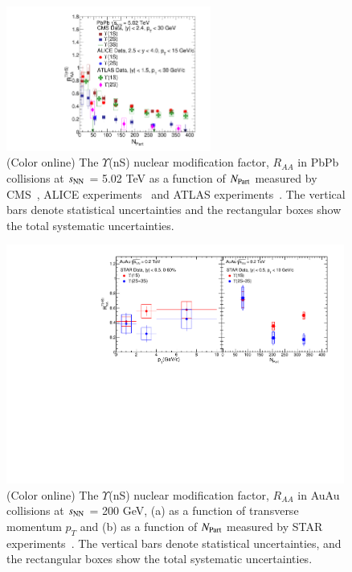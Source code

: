 \begin{figure}
  \begin{center}
  \includegraphics[width=0.6\textwidth]{Figures/ExpOverview/Fig_LHC_YnSRAANPart.pdf}
  \caption{(Color online) The $\Upsilon$(nS) nuclear modification factor, $R_{AA}$
   in PbPb collisions at $s_{\rm NN}$ = 5.02 TeV as a function of $N_{\rm Part}$
   measured by CMS~\cite{CMS:2018zza}, ALICE experiments~\cite{ALICE:2020wwx} and
   ATLAS experiments~\cite{ALICE:2020wwx}.
   The vertical bars denote statistical uncertainties and the rectangular boxes show
   the total systematic uncertainties.
  }
  \label{fig:LHCYnSRAANPart}
  \end{center}
\end{figure}



\begin{figure}
  \includegraphics[width=0.99\textwidth]{Figures/ExpOverview/Fig_RHIC_YnSRAAPt.pdf}
  \caption{(Color online) The $\Upsilon$(nS) nuclear modification factor, $R_{AA}$
in AuAu collisions at $s_{\rm NN}$ = 200 GeV,
     (a) as a function of transverse momentum $p_{T}$
    and (b) as a function of $N_{\rm Part}$ measured by STAR experiments~\cite{Wang:2019vau}. The vertical bars denote
    statistical uncertainties, and the rectangular boxes show the total systematic uncertainties.
  }
  \label{fig:RHICYnSRAAPt}
\end{figure}



